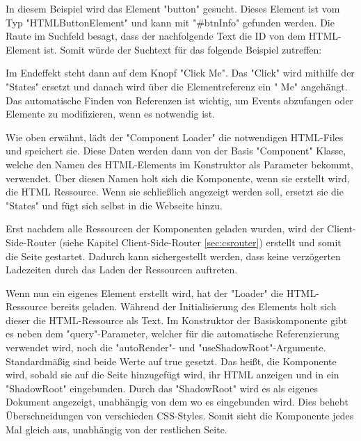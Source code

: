 
In diesem Beispiel wird das Element "{\ttfamily button}" gesucht. Dieses Element ist vom Typ "{\ttfamily HTMLButtonElement}" und kann mit "{\ttfamily \#btnInfo}" gefunden werden. Die Raute im Suchfeld besagt, dass der nachfolgende Text die ID von dem HTML-Element ist. Somit würde der Suchtext für das folgende Beispiel zutreffen:


Im Endeffekt steht dann auf dem Knopf "Click Me". Das "Click" wird mithilfe der
"States" ersetzt und danach wird über die Elementreferenz ein " Me" angehängt. Das automatische Finden von Referenzen ist wichtig, um Events abzufangen oder Elemente zu modifizieren, wenn es notwendig ist.

Wie oben erwähnt, lädt der "Component Loader" die notwendigen HTML-Files und speichert sie. Diese Daten werden dann von der Basis "Component" Klasse, welche den Namen des HTML-Elements im Konstruktor als Parameter bekommt, verwendet. Über diesen Namen holt sich die Komponente, wenn sie erstellt wird, die HTML Ressource. Wenn sie schließlich angezeigt werden soll, ersetzt sie die "States" und fügt sich selbst in die Webseite hinzu.


Erst nachdem alle Ressourcen der Komponenten geladen wurden, wird der Client-Side-Router (siehe Kapitel Client-Side-Router \ref{sec:csrouter}) erstellt und somit die Seite gestartet. Dadurch kann sichergestellt werden, dass keine verzögerten Ladezeiten durch das Laden der Ressourcen auftreten.

\begin{minipage}{\textwidth}
    
    Wenn nun ein eigenes Element erstellt wird, hat der "Loader" die HTML-Ressource bereits geladen. Während der Initialisierung des Elements holt sich dieser die HTML-Ressource als Text. Im Konstruktor der Basiskomponente gibt es neben dem "query"-Parameter, welcher für die automatische Referenzierung verwendet wird, noch die "autoRender"- und "useShadowRoot"-Argumente. Standardmäßig sind beide Werte auf {\ttfamily true} gesetzt. Das heißt, die Komponente wird, sobald sie auf die Seite hinzugefügt wird, ihr HTML anzeigen und in ein "ShadowRoot" eingebunden. Durch das "ShadowRoot" wird es als eigenes Dokument angezeigt, unabhängig von dem wo es eingebunden wird. Dies behebt Überschneidungen von verschieden CSS-Styles. Somit sieht die Komponente jedes Mal gleich aus, unabhängig von der restlichen Seite.
\end{minipage}

